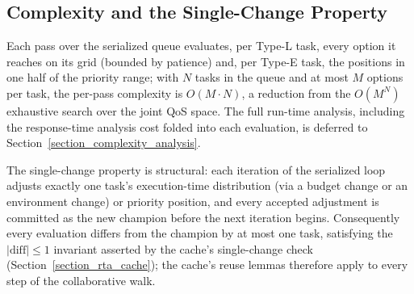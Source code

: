     \subsection{Complexity and the Single-Change Property}
    \label{section_complexity_single_change}

    Each pass over the serialized queue evaluates, per Type-L task, every option it reaches on its grid (bounded by patience) and, per Type-E task, the positions in one half of the priority range; with $N$ tasks in the queue and at most $M$ options per task, the per-pass complexity is $O(M \cdot N)$, a reduction from the $O(M^N)$ exhaustive search over the joint QoS space.
    The full run-time analysis, including the response-time analysis cost folded into each evaluation, is deferred to Section~\ref{section_complexity_analysis}.

    The single-change property is structural: each iteration of the serialized loop adjusts exactly one task's execution-time distribution (via a budget change or an environment change) or priority position, and every accepted adjustment is committed as the new champion before the next iteration begins.
    Consequently every evaluation differs from the champion by at most one task, satisfying the $|\mathrm{diff}| \leq 1$ invariant asserted by the cache's single-change check (Section~\ref{section_rta_cache}); the cache's reuse lemmas therefore apply to every step of the collaborative walk.
